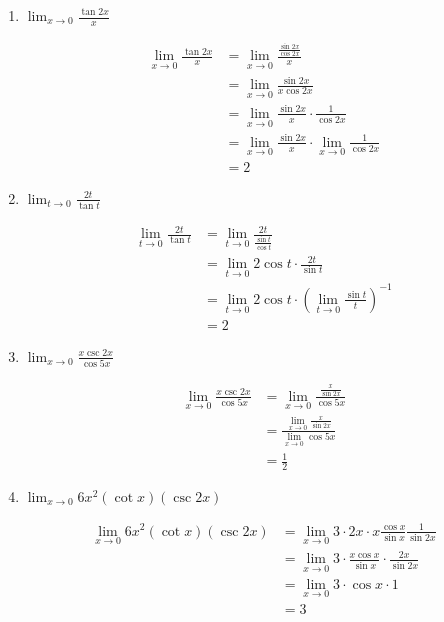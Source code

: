 \documentclass[a4paper, 12pt]{article}
\begin{document}
\begin{enumerate}
    \item $\lim_{x \to 0} \frac{\tan 2x}{x}$
    
    \begin{align*}
        \lim_{x \to 0} \frac{\tan 2x}{x} &= \lim_{x \to 0} \frac{\frac{\sin 2x}{\cos 2x}}{x} \\
        &= \lim_{x \to 0} \frac{\sin 2x}{x \cos 2x}\\
        &= \lim_{x \to 0} \frac{\sin 2x}{x} \cdot \frac{1}{ \cos 2x} \\
        &= \lim_{x \to 0} \frac{\sin 2x}{x} \cdot \lim_{x \to 0}\frac{1}{ \cos 2x}\\
        &= 2
    \end{align*}

    \item $\lim_{t \to 0} \frac{2t}{\tan t}$
    
    \begin{align*}
        \lim_{t \to 0} \frac{2t}{\tan t} &= \lim_{t \to 0} \frac{2t}{\frac{\sin t}{ \cos t}}\\
        &= \lim_{t \to 0} 2 \cos t \cdot \frac{2t}{\sin t}\\
        &= \lim_{t \to 0} 2 \cos t \cdot \left(\lim_{t \to 0}  \frac{\sin t}{t} \right)^{-1}\\
        &= 2
    \end{align*} 

    \item $\lim_{x \to 0} \frac{x \csc 2x}{\cos 5x}$
    
    \begin{align*}
        \lim_{x \to 0} \frac{x \csc 2x}{\cos 5x} &= \lim_{x \to 0} \frac{\frac{x}{\sin 2x}}{\cos 5x}\\
        &= \frac{ \lim_{x \to 0}\frac{x}{\sin 2x}}{\lim_{x \to 0} \cos 5x}\\
        &= \frac{1}{2}
    \end{align*}

    \item $\lim_{x \to 0} 6x^2 (\cot x) (\csc 2x)$
    
    \begin{align*}
        \lim_{x \to 0} 6x^2 (\cot x) (\csc 2x) &= \lim_{x \to 0} 3\cdot 2x \cdot x \frac{\cos x}{\sin x} \frac{1}{\sin 2x}\\
        &= \lim_{x \to 0} 3\cdot\frac{x \cos x}{\sin x}\cdot \frac{2x}{\sin 2x}\\
        &= \lim_{x \to 0} 3 \cdot \cos x \cdot 1\\
        &= 3
    \end{align*}


\end{enumerate}
\end{document}
